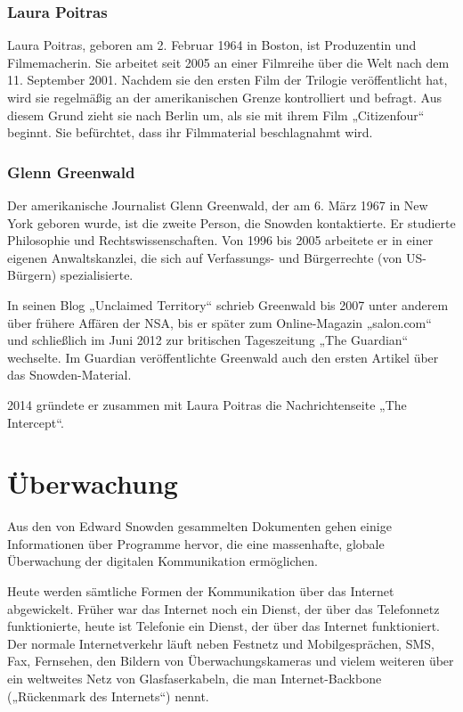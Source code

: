 \documentclass[12pt,a4paper]{scrartcl}
\begin{document}
\subsubsection{Laura Poitras}
Laura Poitras, geboren am 2. Februar 1964 in Boston, ist Produzentin und Filmemacherin. Sie arbeitet seit 2005 an einer Filmreihe über die Welt nach dem 11. September 2001. Nachdem sie den ersten Film der Trilogie veröffentlicht hat, wird sie regelmäßig an der amerikanischen Grenze kontrolliert und befragt. Aus diesem Grund zieht sie nach Berlin um, als sie mit ihrem Film „Citizenfour“ beginnt. Sie befürchtet, dass ihr Filmmaterial beschlagnahmt wird.\cite{praxisfilms}

\subsubsection{Glenn Greenwald}
Der amerikanische Journalist Glenn Greenwald, der am 6. März 1967 in New York geboren wurde, ist die zweite Person, die Snowden kontaktierte. Er studierte Philosophie und Rechtswissenschaften.\cite{wiki_greenwald} Von 1996 bis 2005 arbeitete er in einer eigenen Anwaltskanzlei, die sich auf Verfassungs- und Bürgerrechte (von US-Bürgern) spezialisierte.\cite{unclaimed_response}

In seinen Blog „Unclaimed Territory“ schrieb Greenwald bis 2007 unter anderem über frühere Affären der NSA, bis er später zum Online-Magazin „salon.com“ und schließlich im Juni 2012 zur britischen Tageszeitung „The Guardian“ wechselte. Im Guardian veröffentlichte Greenwald auch den ersten Artikel über das Snowden-Material.\cite{wiki_greenwald}

2014 gründete er zusammen mit Laura Poitras die Nachrichtenseite „The Intercept“.\cite{intercept_about}

\section{Überwachung}
Aus den von Edward Snowden gesammelten Dokumenten gehen einige Informationen über Programme hervor, die eine massenhafte, globale Überwachung der digitalen Kommunikation ermöglichen.

Heute werden sämtliche Formen der Kommunikation über das Internet abgewickelt. Früher war das Internet noch ein Dienst, der über das Telefonnetz funktionierte, heute ist Telefonie ein Dienst, der über das Internet funktioniert. Der normale Internetverkehr läuft neben Festnetz und Mobilgesprächen, SMS, Fax, Fernsehen, den Bildern von Überwachungskameras und vielem weiteren über ein weltweites Netz von Glasfaserkabeln, die man Internet-Backbone („Rückenmark des Internets“) nennt.
\end{document}
